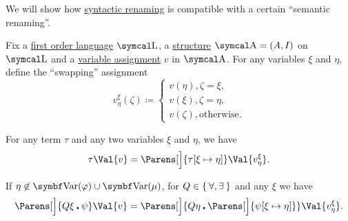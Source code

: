 \begin{proposition}\label{thm:swapping_assignment_compatibility}
  We will show how \hyperref[remark:first_order_substitution_renaming_justification]{syntactic renaming} is compatible with a certain \enquote{semantic renaming}.

  Fix a \hyperref[def:first_order_language]{first order language} \( \CL \), a \hyperref[def:first_order_structure]{structure} \( \CA = (A, I) \) on \( \CL \) and a \hyperref[def:first_order_valuation/variable_assignment]{variable assignment} \( v \) in \( \CA \). For any variables \( \xi \) and \( \eta \), define the \enquote{swapping} assignment
  \begin{equation}\label{eq:thm:swapping_assignment_compatibility/swapping_assignment}
    v_\eta^\xi(\zeta) \coloneqq \begin{cases}
      v(\eta), \zeta = \xi, \\
      v(\xi), \zeta = \eta, \\
      v(\zeta), \text{otherwise}.
    \end{cases}
  \end{equation}

  \begin{PropEnum}
     For any term \( \tau \) and any two variables \( \xi \) and \( \eta \), we have
    \begin{equation}\label{eq:thm:swapping_assignment_compatibility/terms}
      \tau\Val{v}
      =
      \Parens[\Big]{ \tau[\xi \mapsto \eta] }\Val{v_\eta^\xi}.
    \end{equation}

     If \( \eta \not\in \Bold{Var}(\varphi) \cup \Bold{Var}(\mu) \), for \( Q \in \Set{ \forall, \exists } \) and any \( \xi \) we have
    \begin{equation}\label{eq:thm:swapping_assignment_compatibility/formulas}
      \Parens[\Big]{ Q \xi \centerdot \psi }\Val{v}
      =
      \Parens[\Big]{ Q \eta \centerdot \Parens[\Big]{ \psi[\xi \mapsto \eta] } }\Val{v_\eta^\xi}.
    \end{equation}
  \end{PropEnum}
\end{proposition}
